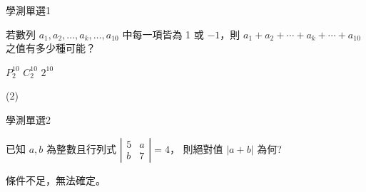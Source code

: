 \begin{QUESTIONS}
    \begin{QUESTION}
        \begin{ExamInfo}{99}{學測}{單選}{1}
        \end{ExamInfo}
        \begin{ExamAnsRateInfo}{49}{82}{49}{16}
        \end{ExamAnsRateInfo}
        \begin{QBODY}
            若數列 $a_1,a_2,\dots,a_k,\dots,a_{10}$ 中每一項皆為 1 或 $-1$，則 $a_1 +a_2 +\cdots +a_k +\cdots+a_{10}$ 之值有多少種可能？
			\begin{QOPS} 
				\QOP $P^{10}_2$    
				\QOP $C^{10}_2$    
				\QOP $2^{10}$
			\end{QOPS}
        \end{QBODY}
        \begin{QFROMS}
        \end{QFROMS}
        \begin{QTAGS}\end{QTAGS}
        \begin{QANS}
            (2)
        \end{QANS}
        \begin{QSOLLIST}
        \end{QSOLLIST}
        \begin{QEMPTYSPACE}
        \end{QEMPTYSPACE}
    \end{QUESTION}
    \begin{QUESTION}
        \begin{ExamInfo}{99}{學測}{單選}{2}
        \end{ExamInfo}
        \begin{ExamAnsRateInfo}{58}{83}{62}{29}
        \end{ExamAnsRateInfo}
        \begin{QBODY}
            已知 $a,b$ 為整數且行列式 $\left| \begin{array}{cc} 5 & a \\ b & 7  \end{array}\right| =4$，
			則絕對值 $|a+b|$ 為何? 
			\begin{QOPS} 
				\QOP 16 
				\QOP 31 
				\QOP 32 
				\QOP 39 
				\QOP 條件不足，無法確定。
			\end{QOPS}
        \end{QBODY}

\end{QUESTION}
\end{QUESTIONS}
